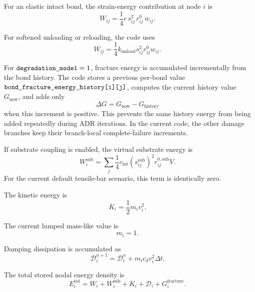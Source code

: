 \documentclass[11pt]{article}
\newcommand{\code}[1]{\texttt{\detokenize{#1}}}
\begin{document}
For an elastic intact bond, the strain-energy contribution at node \(i\) is
\begin{equation}
    W_{ij}
    =
    \frac{1}{4}
    c\,s_{ij}^2\,r_{ij}^0\,w_{ij}.
\end{equation}

For softened unloading or reloading, the code uses
\begin{equation}
    W_{ij}
    =
    \frac{1}{4}
    k_{\mathrm{unload}}
    s_{ij}^2
    r_{ij}^0
    w_{ij}.
\end{equation}

For \(\code{degradation_model}=1\), fracture energy is accumulated
incrementally from the bond history. The code stores a previous per-bond value
\(\code{bond_fracture_energy_history[i][j]}\), computes the current history
value \(G_{\mathrm{now}}\), and adds only
\begin{equation}
    \Delta G = G_{\mathrm{now}}-G_{\mathrm{history}}
\end{equation}
when this increment is positive. This prevents the same history energy from
being added repeatedly during ADR iterations. In the current code, the other
damage branches keep their branch-local complete-failure increments.

If substrate coupling is enabled, the virtual substrate energy is
\begin{equation}
    W_i^{\mathrm{sub}}
    =
    \sum_j
    \frac{1}{4}
    c_{\mathrm{int}}
    \left(s_{ij}^{\mathrm{sub}}\right)^2
    r_{ij}^{0,\mathrm{sub}}
    V.
\end{equation}
For the current default tensile-bar scenario, this term is identically zero.

The kinetic energy is
\begin{equation}
    K_i =
    \frac{1}{2}m_i v_i^2.
\end{equation}

The current lumped mass-like value is
\begin{equation}
    m_i=1.
\end{equation}

Damping dissipation is accumulated as
\begin{equation}
    \mathcal{D}_i^{n+1}
    =
    \mathcal{D}_i^n
    +
    m_i c_d v_i^2\Delta t .
\end{equation}

The total stored nodal energy density is
\begin{equation}
    E_i^{\mathrm{tot}}
    =
    W_i
    +
    W_i^{\mathrm{sub}}
    +
    K_i
    +
    \mathcal{D}_i
    +
    G_i^{\mathrm{fracture}}.
\end{equation}
\end{document}
